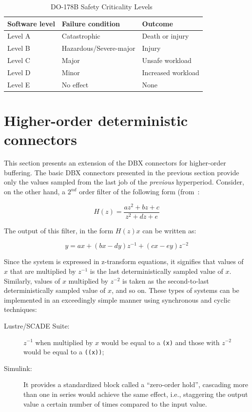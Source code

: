 \begin{table}
\centering
{\footnotesize
\begin{tabular}{|l|l|l|}
\hline
\textbf{Software level}&\textbf{Failure condition}&\textbf{Outcome}\\
\hline
Level A & Catastrophic & Death or injury\\
Level B & Hazardous/Severe-major & Injury\\
Level C & Major & Unsafe workload\\
Level D & Minor & Increased workload\\
Level E & No effect & None\\
\hline
\end{tabular}
}
\caption{DO-178B Safety Criticality Levels~\cite{gasperoni@ae02}}
\label{table:do178b_cats}
\end{table}

\section{Higher-order deterministic connectors}
This section presents an extension of the DBX connectors for
higher-order buffering. The basic DBX connectors presented in the
previous section provide only the values sampled from the last job of
the \emph{previous} hyperperiod. Consider, on the other hand, a
$2^{nd}$ order filter of the following form
(from~\cite{halbwachs@ieee91}:

\begin{displaymath}
H(z) = \frac{az^2 + bz + c}{z^2 + dz + e}
\end{displaymath}

The output of this filter, in the form $H(z)x$ can be written as:

\begin{displaymath}
y = ax + (bx-dy)z^{-1} + (cx-ey)z^{-2}
\end{displaymath}

Since the system is expressed in z-transform equations, it signifies
that values of $x$ that are multiplied by $z^{-1}$ is the last
deterministically sampled value of $x$. Similarly, values of $x$
multiplied by $z^{-2}$ is taken as the second-to-last
deterministically sampled value of $x$, and so on. These types of
systems can be implemented in an exceedingly simple manner using
synchronous and cyclic techniques:

\begin{description}
\item[Lustre/SCADE Suite:]{$z^{-1}$ when multiplied by $x$ would be
  equal to a \texttt{(x)} and those with $z^{-2}$ would be
  equal to a \texttt{(}\texttt{(x))};}
\item[Simulink:]{It provides a standardized block called a
  ``zero-order hold'', cascading more than one in series would achieve
  the same effect, i.e., staggering the output value a certain number
  of times compared to the input value.}
\end{description}

